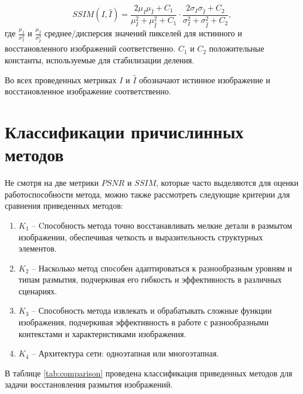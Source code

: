 \begin{equation}
	SSIM(I, \hat{I}) = \frac{{2\mu_I \mu_{\hat{I}} + C_1}}{{\mu_I^2 + \mu_{\hat{I}}^2 + C_1}} \cdot \frac{2\sigma_I \sigma_{\hat{I}} + C_2}{\sigma_I^2 + \sigma_{\hat{I}}^2 + C_2},
\end{equation}
где \(\frac{\mu_{I}}{\sigma_{I}^2}\) и \(\frac{\mu_{\hat{I}}}{\sigma_{\hat{I}}^2}\) среднее/дисперсия значений пикселей для истинного и восстановленного изображений соответственно. \(C_1\) и \(C_2\) положительные константы, используемые для стабилизации деления.

Во всех проведенных метриках \(I\) и \(\hat{I}\) обозначают истинное изображение и восстановленное изображение соответственно.

\section{Классификации причислинных методов}

Не смотря на две метрики \(PSNR\) и \(SSIM\), которые часто выделяются для оценки работоспособности метода, можно также рассмотреть следующие критерии для сравнения приведенных методов:
\begin{enumerate}
	\item \(K_{1}\) -- Cпособность метода точно восстанавливать мелкие детали в размытом изображении, обеспечивая четкость и выразительность структурных элементов.
	\item \(K_{2}\) -- Насколько метод способен адаптироваться к разнообразным уровням и типам размытия, подчеркивая его гибкость и эффективность в различных сценариях.
	\item \(K_{3}\) -- Способность метода извлекать и обрабатывать сложные функции изображения, подчеркивая эффективность в работе с разнообразными контекстами и характеристиками изображения.
	\item \(K_{4}\) -- Архитектура сети: одноэтапная или многоэтапная.
\end{enumerate}

В таблице \ref{tab:comparison} проведена классификация приведенных методов для задачи восстановления размытия изображений.


